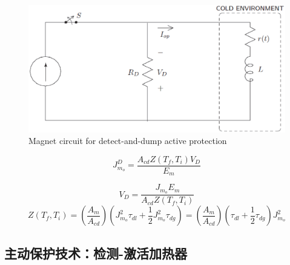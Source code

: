 \begin{figure}
	\centering
	\includegraphics[scale=0.6]{chpt8/figs/fig8.17.eps}
	\caption{Magnet circuit for detect-and-dump active protection}
\end{figure}



\begin{equation}%
J_{m_o}^{D}=\frac{A_{cd}Z(T_f,T_i)V_D}{E_m}
\end{equation}



\begin{equation}%
V_D=\frac{J_{m_o}E_m}{A_{cd}Z(T_f,T_i)}
\end{equation}
\begin{equation}%
Z(T_f,T_i)=\left(\frac{A_m}{A_{cd}}\right)(J_{m_o}^{2}\tau_{dl}+\frac{1}{2}J_{m_o}^{2}\tau_{dg})
=\left(\frac{A_m}{A_{cd}}\right)(\tau_{dl}+\frac{1}{2}\tau_{dg})J_{m_o}^{2}
\end{equation}






\subsection{主动保护技术：检测-激活加热器}

